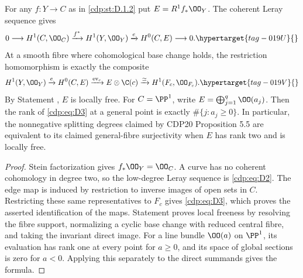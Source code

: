 \begin{proposition}\hypertarget{tag-01G2}{}\label{cdp:st:D.1.4}

For any $f:Y\to C$ as in \ref{cdp:st:D.1.2} put $E=R^1f_*\OO_Y$.
The coherent Leray sequence gives
\begin{equation}
0\longrightarrow H^1(C,\OO_C)\xrightarrow{f^*}H^1(Y,\OO_Y)
\xrightarrow{e}H^0(C,E)\longrightarrow0.               \hypertarget{tag-019U}{}\label{cdp:eq:D2}
\end{equation}
At a smooth fibre where cohomological base change holds, the
restriction homomorphism is exactly the composite
\begin{equation}
H^1(Y,\OO_Y)\xrightarrow{e}H^0(C,E)
\xrightarrow{\operatorname{ev}_c}E\otimes\C(c)
\xrightarrow{\simeq}H^1(F_c,\OO_{F_c}).               \hypertarget{tag-019V}{}\label{cdp:eq:D3}
\end{equation}
By Statement , $E$ is locally free. For $C=\PP^1$, write
$E=\bigoplus_{j=1}^q\OO(a_j)$.
Then the rank of \eqref{cdp:eq:D3} at a general point is exactly
$\#\{j:a_j\geq0\}$. In particular, the nonnegative splitting
degrees claimed by CDP20 Proposition 5.5 are equivalent to its
claimed general-fibre surjectivity when $E$ has rank two and is
locally free.
\end{proposition}


\begin{proof}
Stein factorization gives $f_*\OO_Y=\OO_C$. A curve has no coherent
cohomology in degree two, so the low-degree Leray sequence is \eqref{cdp:eq:D2}.
The edge map is induced by restriction to inverse images of open
sets in $C$. Restricting these same representatives to $F_c$ gives
\eqref{cdp:eq:D3}, which proves the asserted identification of the maps.
Statement  proves local freeness by resolving the fibre support,
normalizing a cyclic base change with reduced central fibre, and
taking the invariant direct image. For a line bundle
$\OO(a)$ on $\PP^1$, its evaluation has rank one at every point
for $a\geq0$, and its space of global sections is zero for $a<0$.
Applying this separately to the direct summands gives the formula.

\end{proof}